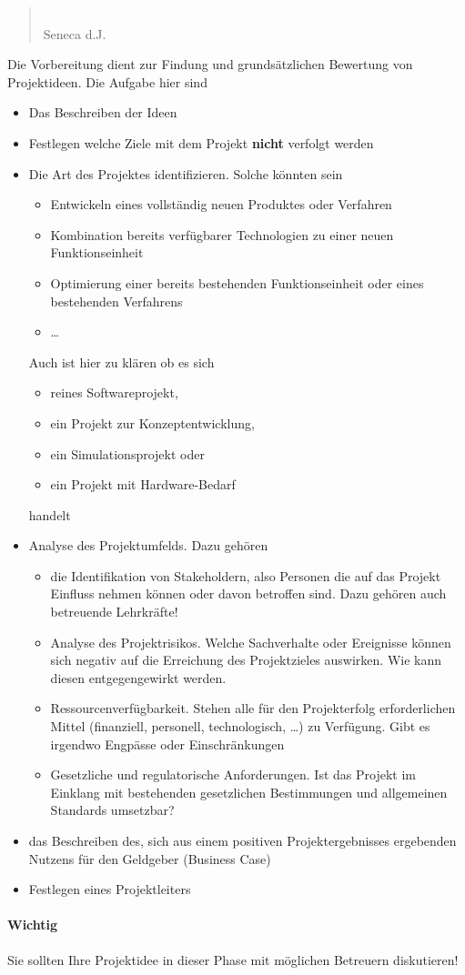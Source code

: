 \renewcommand*{\authorOfNextLines}{Helmut Quinz}
\begin{quote}
	\\
	\small{Seneca d.J.}
\end{quote}
Die Vorbereitung dient zur Findung und grundsätzlichen Bewertung von Projektideen.
Die Aufgabe hier sind 
\begin{itemize}
	\item Das Beschreiben der Ideen
	\item Festlegen welche Ziele mit dem Projekt \textbf{nicht} verfolgt werden
	\item Die Art des Projektes identifizieren. Solche könnten sein
		\begin{itemize}
			\item Entwickeln eines vollständig neuen Produktes oder Verfahren
			\item Kombination bereits verfügbarer Technologien zu einer neuen Funktionseinheit
			\item Optimierung einer bereits bestehenden Funktionseinheit oder eines bestehenden Verfahrens
			\item \dots
		\end{itemize} 
		Auch ist hier zu klären ob es sich 
		\begin{itemize}
			\item reines Softwareprojekt,
			\item ein Projekt zur Konzeptentwicklung,
			\item ein Simulationsprojekt oder 
			\item ein Projekt  mit Hardware-Bedarf
		\end{itemize}
		handelt
	\item Analyse des Projektumfelds. Dazu gehören 
		\begin{itemize}
			\item die Identifikation von Stakeholdern, also Personen die auf das Projekt Einfluss nehmen können oder davon betroffen sind.
					Dazu gehören auch betreuende Lehrkräfte!
			\item Analyse des Projektrisikos.
					Welche Sachverhalte oder Ereignisse können sich negativ auf die Erreichung des Projektzieles auswirken.
					Wie kann diesen entgegengewirkt werden.
			\item Ressourcenverfügbarkeit.
					Stehen alle für den Projekterfolg erforderlichen Mittel (finanziell, personell, technologisch, \dots) zu Verfügung.
					Gibt es irgendwo Engpässe oder Einschränkungen
			\item Gesetzliche und regulatorische Anforderungen.
					Ist das Projekt im Einklang mit bestehenden gesetzlichen Bestimmungen und allgemeinen Standards umsetzbar?
		\end{itemize}
	\item das Beschreiben des, sich aus einem positiven Projektergebnisses ergebenden Nutzens für den Geldgeber (Business Case)
	\item Festlegen eines Projektleiters
\end{itemize}
\paragraph{Wichtig} Sie sollten Ihre Projektidee in dieser Phase mit möglichen Betreuern diskutieren!